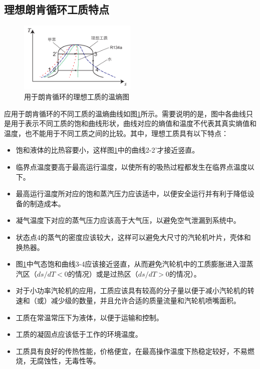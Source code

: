 \subsection{理想朗肯循环工质特点}
\label{sec:IdealRankineCycleFluid}

\begin{figure}[!ht]
\centering 
\includegraphics[width=0.5\textwidth]{fig/idealTs}
\caption{用于朗肯循环的理想工质的温熵图}
\label{fig:idealTs}
\end{figure}

应用于朗肯循环的不同工质的温熵曲线如图\ref{fig:idealTs}所示。需要说明的是，图中各曲线只是用于表示不同工质的饱和曲线形状，曲线对应的熵值和温度不代表其真实熵值和温度，也不能用于不同工质之间的比较。其中，理想工质具有以下特点\cite{Abbin1977}：
\begin{itemize}

	\item 饱和液体的比热容要小，这样图\ref{fig:idealTs}中的曲线2-2'才接近竖直。
	\item 临界点温度要高于最高运行温度，以使所有的吸热过程都发生在临界点温度以下。
	\item 最高运行温度所对应的饱和蒸汽压力应该适中，以便安全运行并有利于降低设备的制造成本。
	\item 凝气温度下对应的蒸气压力应该高于大气压，以避免空气泄漏到系统中。
	\item 状态点4的蒸气的密度应该较大，这样可以避免大尺寸的汽轮机叶片，壳体和换热器。
	\item 图\ref{fig:idealTs}中气态饱和曲线3-4应该接近竖直，从而避免汽轮机中的工质膨胀进入湿蒸汽区（$ds/dT < 0$的情况）或是过热区（$ds/dT > 0$的情况）。
	\item 对于小功率汽轮机的应用，工质应该具有较高的分子量以便于减小汽轮机的转速和（或）减少级的数量，并且允许合适的质量流量和汽轮机喷嘴面积。
	\item 工质在常温常压下为液体，以便于运输和控制。
	\item 工质的凝固点应该低于工作的环境温度。
	\item 工质具有良好的传热性能，价格便宜，在最高操作温度下热稳定较好，不易燃烧，无腐蚀性，无毒性等。
\end{itemize}

